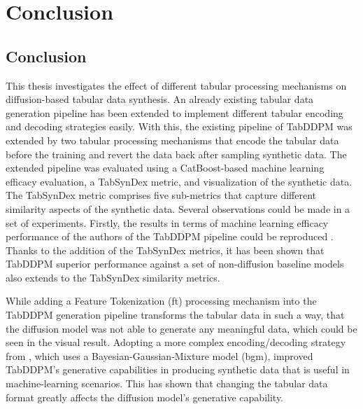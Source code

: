 \chapter{Conclusion}
\label{ch:conclusion}

\section*{Conclusion}
\label{ch:conclusion_}

This thesis investigates the effect of different tabular processing mechanisms on diffusion-based tabular data synthesis.
An already existing tabular data generation pipeline has been extended to implement different tabular encoding and decoding strategies easily.
With this, the existing pipeline of TabDDPM \cite{kotelnikov2022TabDDPMModellingTabular} was extended by two tabular processing mechanisms that encode the tabular data before the training and revert the data back after sampling synthetic data.
The extended pipeline was evaluated using a CatBoost-based machine learning efficacy evaluation, a TabSynDex metric, and visualization of the synthetic data.
The TabSynDex metric comprises five sub-metrics that capture different similarity aspects of the synthetic data.
Several observations could be made in a set of experiments.
Firstly, the results in terms of machine learning efficacy performance of the authors of the TabDDPM pipeline could be reproduced \cite{kotelnikov2022TabDDPMModellingTabular}.
Thanks to the addition of the TabSynDex metrics, it has been shown that TabDDPM superior performance against a set of non-diffusion baseline models also extends to the TabSynDex similarity metrics.

While adding a Feature Tokenization (\gls{ft}) processing mechanism into the TabDDPM generation pipeline transforms the tabular data in such a way,
that the diffusion model was not able to generate any meaningful data, which could be seen in the visual result.
Adopting a more complex encoding/decoding strategy from \cite{zhao2022CTABGANEnhancingTabular}, which uses a Bayesian-Gaussian-Mixture model (\gls{bgm}),
improved TabDDPM's generative capabilities in producing synthetic data that is useful in machine-learning scenarios.
This has shown that changing the tabular data format greatly affects the diffusion model's generative capability.

